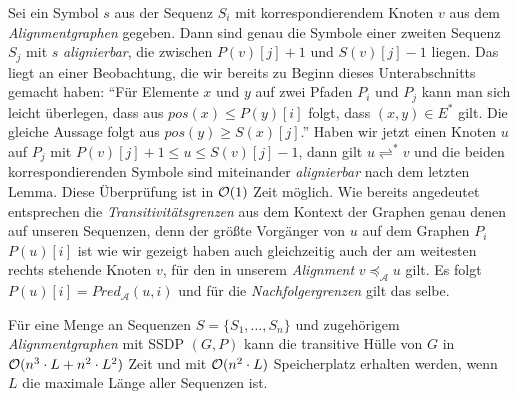 Sei ein Symbol $s$ aus der Sequenz $S_i$ mit korrespondierendem Knoten $v$ aus dem \emph{Alignmentgraphen} gegeben. Dann sind genau die Symbole einer zweiten Sequenz $S_j$ mit $s$ \emph{alignierbar}, die zwischen $P(v)[j] + 1$ und $S(v)[j] - 1$ liegen. Das liegt an einer Beobachtung, die wir bereits zu Beginn dieses Unterabschnitts gemacht haben: \enquote{Für Elemente $x$ und $y$ auf zwei Pfaden $P_i$ und $P_j$ kann man sich leicht überlegen, dass aus $pos(x) \leq P(y)[i]$ folgt, dass $(x,y)\in E^*$ gilt. Die gleiche Aussage folgt aus $pos(y) \geq S(x)[j]$.} Haben wir jetzt einen Knoten $u$ auf $P_j$ mit $P(v)[j] +1 \leq u \leq S(v)[j] - 1$, dann gilt $u \rightleftharpoons^{*} v$ und die beiden korrespondierenden Symbole sind miteinander \emph{alignierbar} nach dem letzten Lemma. Diese Überprüfung ist in $\mathcal{O}(1)$ Zeit möglich. Wie bereits angedeutet entsprechen die \emph{Transitivitätsgrenzen} aus dem Kontext der Graphen genau denen auf unseren Sequenzen, denn der größte Vorgänger von $u$ auf dem Graphen $P_i$ $P(u)[i]$ ist wie wir gezeigt haben auch gleichzeitig auch der am weitesten rechts stehende Knoten $v$, für den in unserem \emph{Alignment} $v \preceq_{\mathcal{A}} u$ gilt. Es folgt $P(u)[i] = Pred_{\mathcal{A}}(u,i)$ und für die \emph{Nachfolgergrenzen} gilt das selbe.

\begin{korollar}
	Für eine Menge an Sequenzen $S = \{S_1, \dots, S_n\}$ und zugehörigem \emph{Alignmentgraphen} mit SSDP $(G,P)$ kann die transitive Hülle von $G$ in $\mathcal{O}(n^3\cdot L + n^2\cdot L^2)$ Zeit und mit $\mathcal{O}(n^2\cdot L)$ Speicherplatz erhalten werden, wenn $L$ die maximale Länge aller Sequenzen ist.
\end{korollar}

